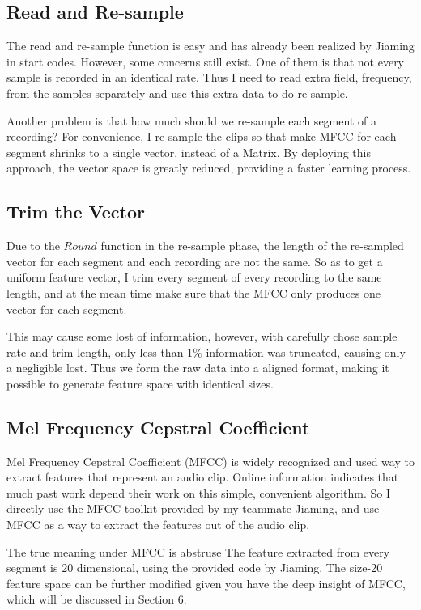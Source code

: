 \documentclass{sig-alternate}
\begin{document}
\subsection{Read and Re-sample}
The read and re-sample function is easy and has already been realized by Jiaming in start codes. However, some concerns still exist. One of them is that not every sample is recorded in an identical rate. Thus I need to read extra field, frequency, from the samples separately and use this extra data to do re-sample.

Another problem is that how much should we re-sample each segment of a recording? For convenience, I re-sample the clips so that make MFCC for each segment shrinks to a single vector, instead of a Matrix. By deploying this approach, the vector space is greatly reduced, providing a faster learning process.


\subsection{Trim the Vector}
Due to the $Round$ function in the re-sample phase, the length of the re-sampled vector for each segment and each recording are not the same. So as to get a uniform feature vector, I trim every segment of every recording to the same length, and at the mean time make sure that the MFCC only produces one vector for each segment.

This may cause some lost of information, however, with carefully chose sample rate and trim length, only less than 1\% information was truncated, causing only a negligible lost. Thus we form the raw data into a aligned format, making it possible to generate feature space with identical sizes.


\subsection{Mel Frequency Cepstral Coefficient}
Mel Frequency Cepstral Coefficient (MFCC) is widely recognized and used way to extract features that represent an audio clip. Online information indicates that much past work depend their work on this simple, convenient algorithm. So I directly use the MFCC toolkit provided by my teammate Jiaming, and use MFCC as a way to extract the features out of the audio clip.

The true meaning under MFCC is abstruse \cite{mfcc} The feature extracted from every segment is 20 dimensional, using the provided code by Jiaming. The size-20 feature space can be further modified given you have the deep insight of MFCC, which will be discussed in Section 6.
\end{document}
